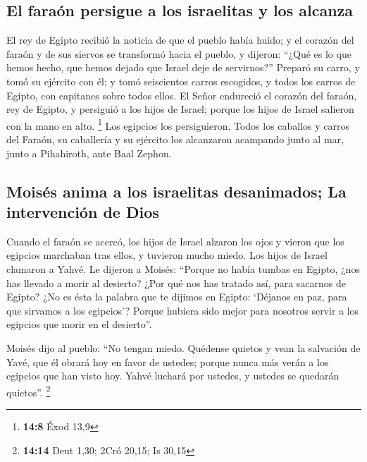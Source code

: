 \begin{paracol}{2}
\hypertarget{el-farauxf3n-persigue-a-los-israelitas-y-los-alcanza}{%
\subsection{El faraón persigue a los israelitas y los
alcanza}\label{el-farauxf3n-persigue-a-los-israelitas-y-los-alcanza}}

 El rey de Egipto recibió la noticia de que el pueblo
había huido; y el corazón del faraón y de sus siervos se transformó
hacia el pueblo, y dijeron: ``¿Qué es lo que hemos hecho, que hemos
dejado que Israel deje de servirnos?''  Preparó su carro,
y tomó su ejército con él;  y tomó seiscientos carros
escogidos, y todos los carros de Egipto, con capitanes sobre todos
ellos.  El Señor endureció el corazón del faraón, rey de
Egipto, y persiguió a los hijos de Israel; porque los hijos de Israel
salieron con la mano en alto. \footnote{\textbf{14:8} Éxod 13,9}
 Los egipcios los persiguieron. Todos los caballos y
carros del Faraón, su caballería y su ejército los alcanzaron acampando
junto al mar, junto a Pihahiroth, ante Baal Zephon.

\hypertarget{moisuxe9s-anima-a-los-israelitas-desanimados-la-intervenciuxf3n-de-dios}{%
\subsection{Moisés anima a los israelitas desanimados; La intervención
de
Dios}\label{moisuxe9s-anima-a-los-israelitas-desanimados-la-intervenciuxf3n-de-dios}}

 Cuando el faraón se acercó, los hijos de Israel alzaron
los ojos y vieron que los egipcios marchaban tras ellos, y tuvieron
mucho miedo. Los hijos de Israel clamaron a Yahvé.  Le
dijeron a Moisés: ``Porque no había tumbas en Egipto, ¿nos has llevado a
morir al desierto? ¿Por qué nos has tratado así, para sacarnos de
Egipto?  ¿No es ésta la palabra que te dijimos en Egipto:
`Déjanos en paz, para que sirvamos a los egipcios'? Porque hubiera sido
mejor para nosotros servir a los egipcios que morir en el desierto''.

 Moisés dijo al pueblo: ``No tengan miedo. Quédense
quietos y vean la salvación de Yavé, que él obrará hoy en favor de
ustedes; porque nunca más verán a los egipcios que han visto hoy.
 Yahvé luchará por ustedes, y ustedes se quedarán
quietos''. \footnote{\textbf{14:14} Deut 1,30; 2Cró 20,15; Is 30,15}


\end{paracol}
